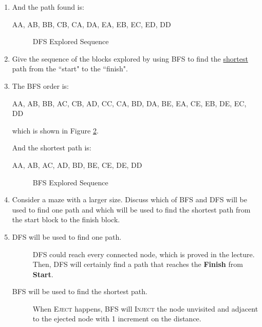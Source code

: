 \documentclass[12pt,a4paper]{article}
\makeatletter
\newtheorem*{solution}{Solution}
\theoremstyle{definition}
\renewenvironment{solution}[1][Solution] {\par\pushQED{\qed}\normalfont\topsep6\p@\@plus6\p@\relax\trivlist\item[\hskip\labelsep\bfseries#1\@addpunct{.}]\ignorespaces}{\popQED\endtrivlist\@endpefalse} \makeatother
\makeatother
\begin{document}
\begin{enumerate}
\begin{enumerate}
\begin{solution}
            And the path found is:
            \begin{tcolorbox}
                AA, AB, BB, CB, CA, DA, EA, EB, EC, ED, DD
            \end{tcolorbox}

            \begin{figure}[h]
                \centering
                
                \caption{DFS Explored Sequence}
                \label{fig:dfs}
            \end{figure}
            
        \end{solution}
        \item Give the sequence of the blocks explored by using BFS to find the \underline{shortest} path from the ``start" to the ``finish".
        \begin{solution}
            The BFS order is:
            \begin{tcolorbox}
                AA, AB, BB, AC, CB, AD, CC, CA, BD, DA, BE, EA, CE, EB, DE, EC, DD
            \end{tcolorbox}
            which is shown in Figure \ref{fig:bfs}.

            And the shortest path is:
            \begin{tcolorbox}
                AA, AB, AC, AD, BD, BE, CE, DE, DD
            \end{tcolorbox}

            \begin{figure}[h]
                \centering
                
                \caption{BFS Explored Sequence}
                \label{fig:bfs}
            \end{figure}
        \end{solution}
        \item Consider a maze with a larger size. Discuss which of BFS and DFS will be used to find one path and which will be used to find the shortest path from the start block to the finish block.
        \begin{solution}
            \begin{description}
                \item[DFS will be used to find one path.] DFS could reach every connected node, which is proved in the lecture. Then, DFS will certainly find a path that reaches the \textbf{Finish} from \textbf{Start}.
                \item[BFS will be used to find the shortest path.] When \textsc{Eject} happens, BFS will \textsc{Inject} the node unvisited and adjacent to the ejected node with 1 increment on the distance. 
                

\end{description}
\end{solution}
\end{enumerate}
\end{enumerate}
\end{document}
